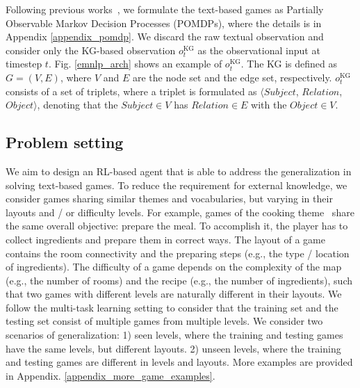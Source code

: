 \documentclass[11pt]{article}
\begin{document}
Following previous works~\cite{hausknecht2019jericho}, we formulate the text-based games as Partially Observable Markov Decision Processes (POMDPs), where the details is in Appendix \ref{appendix_pomdp}. 
We discard the raw textual observation and consider only the KG-based observation $o_t^{\text{KG}}$  as the observational input at timestep $t$. 
Fig. \ref{emnlp_arch} shows an example of $o_t^{\text{KG}}$.
The KG is defined as $G=(V, E)$, where $V$ and $E$ are the node set and the edge set, respectively.  
$o_t^{\text{KG}}$ consists of a set of triplets, where a triplet is formulated as $\langle\mathit{Subject}$, $\mathit{Relation}$, $\mathit{Object}\rangle$, denoting that the $\mathit{Subject} \in V$ has $\mathit{Relation} \in E$ with the $\mathit{Object} \in V$.

\subsection{Problem setting}
We aim to design an RL-based agent that is able to address the generalization in solving text-based games. 
To reduce the requirement for external knowledge, we consider games sharing similar themes and vocabularies, but varying in their layouts and / or difficulty levels. 
For example, games of the cooking theme~\cite{cote2018textworld} share the same overall objective: prepare the meal.
To accomplish it, the player has to collect ingredients and prepare them in correct ways.
The layout of a game contains the room connectivity and the preparing steps (e.g., the type / location of ingredients).
The difficulty of a game depends on the complexity of the map (e.g., the number of rooms) and the recipe (e.g., the number of ingredients), such that two games with different levels are naturally different in their layouts. 
We follow the multi-task learning setting to consider that the training set and the testing set consist of multiple games from multiple levels. 
We consider two scenarios of generalization: 1) seen levels, where the training and testing games have the same levels, but different layouts. 2) unseen levels, where the training and testing games are different in levels and layouts. 
More examples are provided in Appendix. \ref{appendix_more_game_examples}. 


\end{document}
